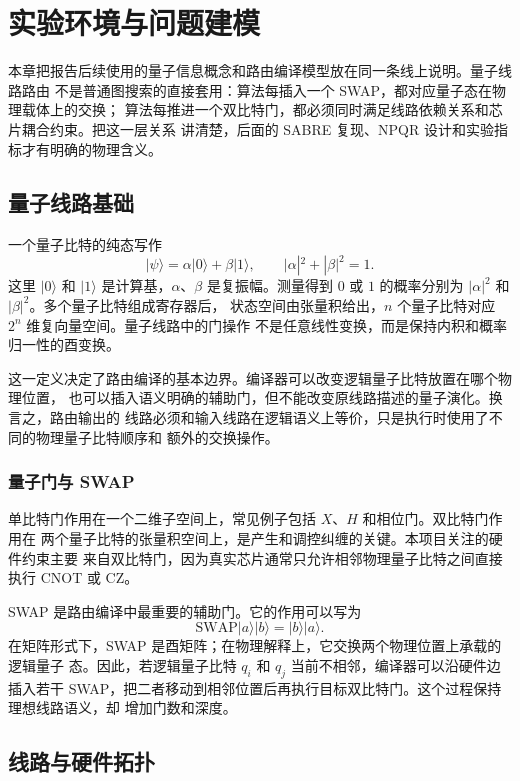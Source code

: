 \section{实验环境与问题建模}

本章把报告后续使用的量子信息概念和路由编译模型放在同一条线上说明。量子线路路由
不是普通图搜索的直接套用：算法每插入一个 SWAP，都对应量子态在物理载体上的交换；
算法每推进一个双比特门，都必须同时满足线路依赖关系和芯片耦合约束。把这一层关系
讲清楚，后面的 SABRE 复现、NPQR 设计和实验指标才有明确的物理含义。

\subsection{量子线路基础}

一个量子比特的纯态写作
\[
  |\psi\rangle=\alpha|0\rangle+\beta|1\rangle,\qquad
  |\alpha|^2+|\beta|^2=1 .
\]
这里 $|0\rangle$ 和 $|1\rangle$ 是计算基，$\alpha$、$\beta$ 是复振幅。测量得到
$0$ 或 $1$ 的概率分别为 $|\alpha|^2$ 和 $|\beta|^2$。多个量子比特组成寄存器后，
状态空间由张量积给出，$n$ 个量子比特对应 $2^n$ 维复向量空间。量子线路中的门操作
不是任意线性变换，而是保持内积和概率归一性的酉变换。

这一定义决定了路由编译的基本边界。编译器可以改变逻辑量子比特放置在哪个物理位置，
也可以插入语义明确的辅助门，但不能改变原线路描述的量子演化。换言之，路由输出的
线路必须和输入线路在逻辑语义上等价，只是执行时使用了不同的物理量子比特顺序和
额外的交换操作。

\subsubsection*{量子门与 SWAP}

单比特门作用在一个二维子空间上，常见例子包括 $X$、$H$ 和相位门。双比特门作用在
两个量子比特的张量积空间上，是产生和调控纠缠的关键。本项目关注的硬件约束主要
来自双比特门，因为真实芯片通常只允许相邻物理量子比特之间直接执行 CNOT 或 CZ。

SWAP 是路由编译中最重要的辅助门。它的作用可以写为
\[
  \mathrm{SWAP}|a\rangle|b\rangle=|b\rangle|a\rangle .
\]
在矩阵形式下，SWAP 是酉矩阵；在物理解释上，它交换两个物理位置上承载的逻辑量子
态。因此，若逻辑量子比特 $q_i$ 和 $q_j$ 当前不相邻，编译器可以沿硬件边插入若干
SWAP，把二者移动到相邻位置后再执行目标双比特门。这个过程保持理想线路语义，却
增加门数和深度。

\subsection{线路与硬件拓扑}

